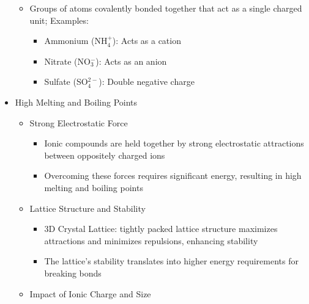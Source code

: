 \begin{itemize}
\begin{itemize}
      \item Groups of atoms covalently bonded together that act as a single charged unit; Examples:

        \begin{itemize}

          \item Ammonium (NH$_4^+$): Acts as a cation

          \item Nitrate (NO$_3^-$): Acts as an anion

          \item Sulfate (SO$_4^{2-}$): Double negative charge

        \end{itemize}

    \end{itemize}

  \item High Melting and Boiling Points

    \begin{itemize}
        
      \item Strong Electrostatic Force

        \begin{itemize}

          \item Ionic compounds are held together by strong electrostatic attractions between oppositely charged ions

          \item Overcoming these forces requires significant energy, resulting in high melting and boiling points

        \end{itemize}

      \item Lattice Structure and Stability

        \begin{itemize}

          \item 3D Crystal Lattice: tightly packed lattice structure maximizes attractions and minimizes repulsions, enhancing stability

          \item The lattice's stability translates into higher energy requirements for breaking bonds
        
        \end{itemize}

      \item Impact of Ionic Charge and Size


\end{itemize}
\end{itemize}
